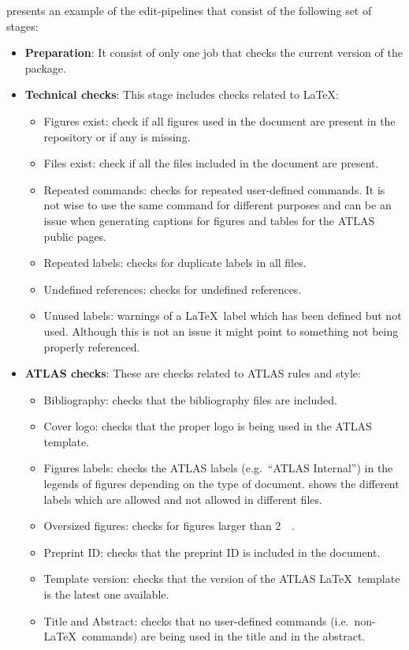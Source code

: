  presents an example of the edit-pipelines that consist of the following set of stages:
\begin{itemize}
\item \textbf{Preparation}: It consist of only one job that checks the current version of the \pogitlab package. 

\item \textbf{Technical checks}: This stage includes checks related to \LaTeX: %
  \begin{itemize}
  \item Figures exist: check if all figures used in the document are present in the repository or if any is missing.
  \item Files exist: check if all the  files included in the document are present.
  \item Repeated commands: checks for repeated user-defined commands.
    It is not wise to use the same command for different purposes and can be an issue when generating captions for figures and tables for the ATLAS public pages.
  \item Repeated labels: checks for duplicate labels in all  files.
  \item Undefined references: checks for undefined references.
  \item Unused labels: warnings of a \LaTeX\ label which has been defined but not used.
    Although this is not an issue it might point to something not being properly referenced.
  \end{itemize}
    
\item \textbf{ATLAS checks}: These are checks related to ATLAS rules and style:
  \begin{itemize}
  \item Bibliography: checks that the bibliography files are included.
  \item Cover logo: checks that the proper logo is being used in the ATLAS template.
  \item Figures labels: checks the ATLAS labels (e.g.\ \enquote{ATLAS Internal}) in the legends of figures depending on the type of document.  shows the different labels which are allowed and not allowed in different files.
  \item Oversized figures: checks for figures larger than \SI{2}{\mega\byte}.
  \item Preprint ID\@: checks that the preprint ID is included in the document.
  \item Template version: checks that the version of the ATLAS \LaTeX\ template is the latest one available.
  \item Title and Abstract: checks that no user-defined commands (i.e.\ non-\LaTeX\ commands) are being used in the title and in the abstract.
  \end{itemize}
   

\end{itemize}
